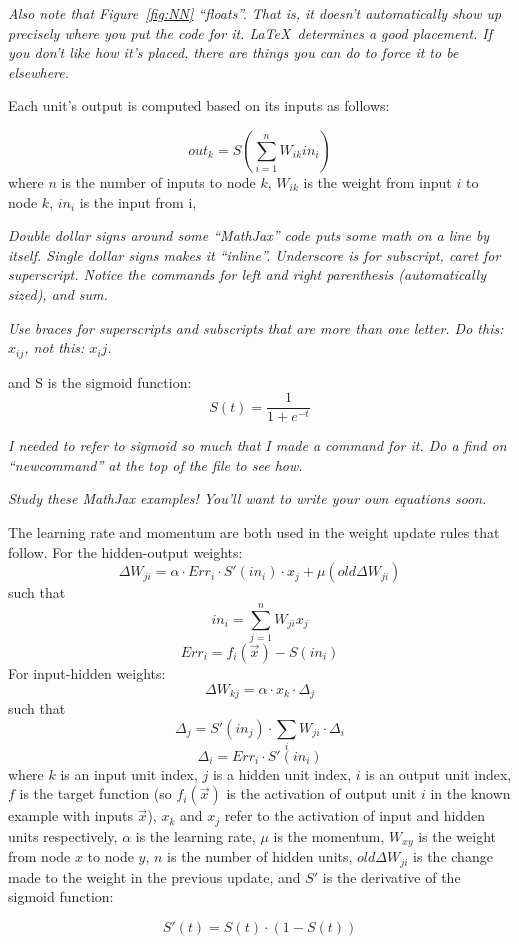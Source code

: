 \documentclass[twocolumn,letterpaper,10pt]{article}
\newcommand{\sigmoid}{$$S(t)=\frac{1}{1+e^{-t}}$$}
\begin{document}
{\it Also note that Figure~\ref{fig:NN} ``floats''. That is, it doesn't automatically show up precisely where you put the code for it. \LaTeX~determines a good placement. If you don't like how it's placed, there are things you can do to force it to be elsewhere.}

Each unit's output is computed based on its inputs as follows: 

$$
out_k = S\left( \sum_{i=1}^n W_{ik}in_{i} \right)
$$
where $n$ is the number of inputs to node $k$, $W_{ik}$ is the weight from input $i$ to node $k$, $in_{i}$ is the input from i, 

{\it Double dollar signs around some ``MathJax'' code puts some math on a line by itself. Single dollar signs makes it ``inline''. Underscore is for subscript, caret for superscript. Notice the commands for left and right parenthesis (automatically sized), and sum.}

{\it Use braces for superscripts and subscripts that are more than one letter. Do this: $x_{ij}$, not this: $x_ij$.}

and S is the sigmoid function:
\sigmoid

{\it I needed to refer to sigmoid so much that I made a command for it. Do a find on ``newcommand'' at the top of the file to see how.}

{\it Study these MathJax examples! You'll want to write your own equations soon.}

The learning rate and momentum are both used in the weight update rules that follow. For the hidden-output weights:
$$\Delta W_{ji} = \alpha \cdot Err_i \cdot S'(in_i) \cdot x_j + \mu(old\Delta W_{ji})$$
such that
$$in_i = \sum_{j = 1}^n W_{ji}x_j$$
$$Err_i = f_i(\vec{x}) - S(in_i)$$
For input-hidden weights:
$$\Delta W_{kj} = \alpha \cdot x_k \cdot \Delta_j$$
such that
$$\Delta_j = S'(in_j) \cdot \sum_{i} W_{ji} \cdot \Delta_i$$
$$\Delta_i = Err_i \cdot S'(in_i)$$
where $k$ is an input unit index, $j$ is a hidden unit index, $i$ is an output unit index, $f$ is the target function (so $f_i(\vec{x})$ is the activation of output unit $i$ in the known example with inputs $\vec{x}$), $x_k$ and $x_j$ refer to the activation of input and hidden units respectively, $\alpha$ is the learning rate, $\mu$ is the momentum, $W_{xy}$ is the weight from node $x$ to node $y$, $n$ is the number of hidden units, $old\Delta W_{ji}$ is the change made to the weight in the previous update, and $S'$ is the derivative of the sigmoid function:

$$S'(t) = S(t) \cdot (1-S(t))$$
\end{document}

